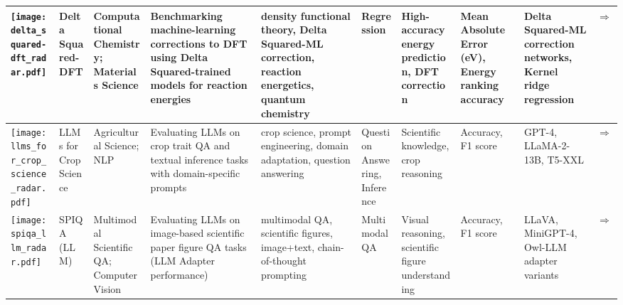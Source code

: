 \begin{landscape}
{\begin{longtable}{|p{}|p{}|p{}|p{}|p{}|p{}|p{}|p{}|p{}|p{}|}
\texttt{[image: delta\_squared-dft\_radar.pdf]} & Delta Squared-DFT & Computational Chemistry; Materials Science & Benchmarking machine-learning corrections to DFT using Delta Squared-trained models for reaction energies & density functional theory, Delta Squared-ML correction, reaction energetics, quantum chemistry & Regression & High-accuracy energy prediction, DFT correction & Mean Absolute Error (eV), Energy ranking accuracy & Delta Squared-ML correction networks, Kernel ridge regression & \cite{khrabrov2024nabla2dftuniversalquantumchemistry}\href{https://neurips.cc/virtual/2024/poster/97788}{$\Rightarrow$} \\ \hline
\texttt{[image: llms\_for\_crop\_science\_radar.pdf]} & LLMs for Crop Science & Agricultural Science; NLP & Evaluating LLMs on crop trait QA and textual inference tasks with domain-specific prompts & crop science, prompt engineering, domain adaptation, question answering & Question Answering, Inference & Scientific knowledge, crop reasoning & Accuracy, F1 score & GPT-4, LLaMA-2-13B, T5-XXL & \cite{shen2024exploringuserretrievalintegration}\href{https://neurips.cc/virtual/2024/poster/97570}{$\Rightarrow$} \\ \hline
\texttt{[image: spiqa\_llm\_radar.pdf]} & SPIQA (LLM) & Multimodal Scientific QA; Computer Vision & Evaluating LLMs on image-based scientific paper figure QA tasks (LLM Adapter performance) & multimodal QA, scientific figures, image+text, chain-of-thought prompting & Multimodal QA & Visual reasoning, scientific figure understanding & Accuracy, F1 score & LLaVA, MiniGPT-4, Owl-LLM adapter variants & \cite{pramanick2025spiqadatasetmultimodalquestion}\href{https://neurips.cc/virtual/2024/poster/97575}{$\Rightarrow$} \\ \hline
\end{longtable}
}

\end{landscape}
